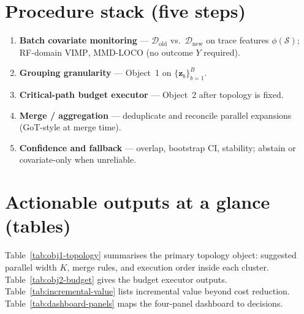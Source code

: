 \documentclass[11pt]{article}
\newcommand{\Dold}{\mathcal{D}_{\mathrm{old}}}
\newcommand{\Dnew}{\mathcal{D}_{\mathrm{new}}}
\newcommand{\z}{\mathbf{z}}
\newcommand{\VIMP}{\mathrm{VIMP}}
\newcommand{\MMD}{\mathrm{MMD}}
\begin{document}
\section{Procedure stack (five steps)}
\label{sec:procedures}

\begin{enumerate}[leftmargin=*]
  \item[\textbf{(0)}] \textbf{Batch covariate monitoring} --- $\Dold$ vs.\
  $\Dnew$ on trace features $\phi(\mathcal{S})$; RF-domain $\VIMP$, $\MMD$-LOCO
  (no outcome $Y$ required).
  \item[\textbf{(1)}] \textbf{Grouping granularity} --- Object~1 on
  $\{\z_b\}_{b=1}^B$.
  \item[\textbf{(2)}] \textbf{Critical-path budget executor} --- Object~2 after
  topology is fixed.
  \item[\textbf{(3)}] \textbf{Merge / aggregation} --- deduplicate and reconcile
  parallel expansions (GoT-style at merge time).
  \item[\textbf{(4)}] \textbf{Confidence and fallback} --- overlap, bootstrap
  CI, stability; abstain or covariate-only when unreliable.
\end{enumerate}

\section{Actionable outputs at a glance (tables)}
\label{sec:action-tables}

Table~\ref{tab:obj1-topology} summarises the primary topology object: suggested
parallel width $K$, merge rules, and execution order inside each cluster.
Table~\ref{tab:obj2-budget} gives the budget executor outputs.
Table~\ref{tab:incremental-value} lists incremental value beyond cost reduction.
Table~\ref{tab:dashboard-panels} maps the four-panel dashboard to decisions.
\end{document}
